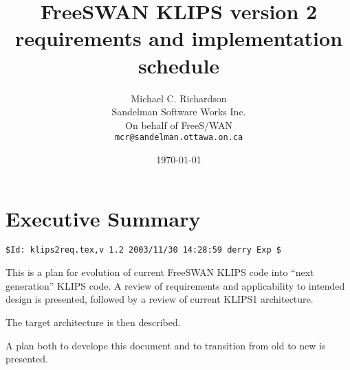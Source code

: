\documentclass[titlepage]{article}
\author{Michael C. Richardson\\
	Sandelman Software Works Inc.\\
	On behalf of FreeS/WAN\\
	{\tt mcr@sandelman.ottawa.on.ca}}
\date{\today}
\title{FreeSWAN KLIPS version 2 requirements and implementation schedule}
\begin{document}
\maketitle\newpage

\section{Executive Summary}

\begin{verbatim}
$Id: klips2req.tex,v 1.2 2003/11/30 14:28:59 derry Exp $
\end{verbatim}

This is a plan for evolution of current FreeSWAN KLIPS code into ``next
generation'' KLIPS code. A review of requirements and applicability to
intended design is presented, followed by a review of current KLIPS1
architecture.

The target architecture is then described.

A plan both to develope this document and to transition from old to new is
presented.









\end{document}

